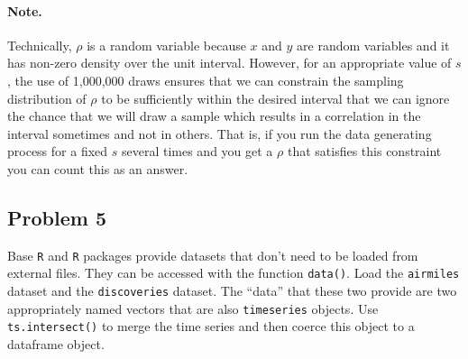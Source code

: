 \documentclass[10pt,letterpaper]{article}
\begin{document}
\paragraph{Note.} Technically, $\rho$ is a random variable because $x$
and $y$ are random variables and it has non-zero density over the unit
interval. However, for an appropriate value of $s$, the use of
1,000,000 draws ensures that we can constrain the sampling
distribution of $\rho$ to be sufficiently within the desired interval
that we can ignore the chance that we will draw a sample which results
in a correlation in the interval sometimes and not in others. That is,
if you run the data generating process for a fixed $s$ several times
and you get a $\rho$ that satisfies this constraint you can count this
as an answer.

% 

\subsection*{Problem 5}
Base \texttt{R} and \texttt{R} packages provide datasets that don't
need to be loaded from external files. They can be accessed with the
function \texttt{data()}. Load the \texttt{airmiles} dataset and the
\texttt{discoveries} dataset. The ``data'' that these two provide are
two appropriately named vectors that are also \texttt{timeseries}
objects. Use \verb=ts.intersect()= to merge the time series and then
coerce this object to a dataframe object.
\end{document}
